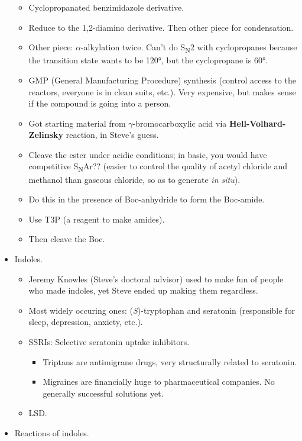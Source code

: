 \documentclass[../notes.tex]{subfiles}
\begin{document}
\begin{itemize}
\begin{itemize}
        \item Cyclopropanated benzimidazole derivative.
        \item Reduce to the 1,2-diamino derivative. Then other piece for condensation.
        \item Other piece: $\alpha$-alkylation twice. Can't do S\textsubscript{N}2 with cyclopropanes because the transition state wants to be \ang{120}, but the cyclopropane is \ang{60}.
        \item GMP (General Manufacturing Procedure) synthesis (control access to the reactors, everyone is in clean suits, etc.). Very expensive, but makes sense if the compound is going into a person.
        \item Got starting material from $\gamma$-bromocarboxylic acid via \textbf{Hell-Volhard-Zelinsky} reaction, in Steve's guess.
        \item Cleave the ester under acidic conditions; in basic, you would have competitive S\textsubscript{N}Ar?? (easier to control the quality of acetyl chloride and methanol than gaseous chloride, so as to generate  \emph{in situ}).
        \item Do this in the presence of Boc-anhydride to form the Boc-amide.
        \item Use T3P (a reagent to make amides).
        \item Then cleave the Boc.
    \end{itemize}
    \item Indoles.
    \begin{itemize}
        \item Jeremy Knowles (Steve's doctoral advisor) used to make fun of people who made indoles, yet Steve ended up making them regardless.
        \item Most widely occuring ones: (\emph{S})-tryptophan and seratonin (responsible for sleep, depression, anxiety, etc.).
        \item SSRIs: Selective seratonin uptake inhibitors.
        \begin{itemize}
            \item Triptans are antimigrane drugs, very structurally related to seratonin.
            \item Migraines are financially huge to pharmaceutical companies. No generally successful solutions yet.
        \end{itemize}
        \item LSD.
    \end{itemize}
    \item Reactions of indoles.

\end{itemize}
\end{document}
